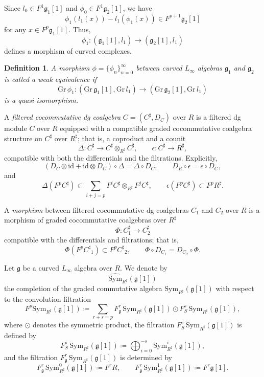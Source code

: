 \documentclass[12pt]{amsart}
\newtheorem{defn}{Definition}[section]
\numberwithin{equation}{section}
\theoremstyle{plain}
\newcommand{\fg}{\mathfrak{g}}
\newcommand{\Sym}{\mathrm{Sym}}
\newcommand{\Gr}{\mathrm{Gr}}
\newcommand{\id}{\mathrm{id}}
\newcommand{\wSym}{\widehat{\Sym}}
\newcommand{\uR}{{R^\sharp}}
\newcommand{\uC}{{C^\sharp}}
\begin{document}
	
	Since $l_0 \in F^1 \fg_1[1]$ and $\phi_0 \in F^1 \fg_2[1]$, we have
	\[
	\phi_1(l_1(x)) - l_1(\phi_1(x)) \in F^{p+1} \fg_2[1]
	\]
	for any $x \in F^p \fg_1[1]$. Thus, 
	\[
	\phi_1\colon (\fg_1[1],l_1) \rightarrow (\fg_2[1], l_1)
	\]
	defines a morphism of curved complexes.
	
	
	
	\begin{defn}
		A morphism $\phi=\{\phi_n\}_{n=0}^\infty$ between curved $L_\infty$ algebras $\fg_1$ and $\fg_2$  is called a \emph{weak equivalence} if 
		\[
		\Gr\, \phi_1 \colon (\Gr\, \fg_1[1], \Gr\, l_1) \longrightarrow(\Gr\, \fg_2[1], \Gr\, l_1)
		\]
		is a quasi-isomorphism.
	\end{defn}
	
	A \emph{filtered cocommutative dg coalgebra} $C=(\uC,D_C)$ over $R$ is a filtered dg module $C$ over $R$ equipped with a compatible graded cocommutative coalgebra structure on $\uC$ over $\uR$; that is, a coproduct and a counit
	\[
	\Delta \colon \uC \longrightarrow \uC \otimes_\uR \uC,
	\qquad
	\epsilon \colon \uC \longrightarrow \uR,
	\]
	compatible with both the differentials and the filtrations. Explicitly,
	\[
	(D_C \otimes \id + \id \otimes D_C)\circ \Delta
	=
	\Delta \circ D_C,
	\qquad
	D_R \circ \epsilon
	=
	\epsilon \circ D_C,
	\]
	and 
	\[
	\Delta(F^p \uC) \subset \sum_{i+j=p} F^i \uC \otimes_\uR F^j \uC,
	\qquad
	\epsilon(F^p \uC) \subset F^p \uR.
	\]
	
	A \emph{morphism} between filtered cocommutative dg coalgebras $C_1$ and $C_2$ over $R$ is a morphism of graded cocommutative coalgebras over $\uR$ 
	\[
	\Phi\colon C_1^\sharp \rightarrow C_2^\sharp
	\]
	compatible with the differentials and filtrations; that is,
	\[
	\Phi(F^p \uC_1) \subset F^p \uC_2, \qquad \Phi \circ D_{C_1} = D_{C_2} \circ \Phi.
	\]	
	
	Let $\fg$ be a curved $L_\infty$ algebra over $R$. We denote by
	\[
	\wSym_\uR(\fg[1])
	\]
	the completion of the graded commutative algebra $\Sym_\uR(\fg[1])$ with respect to the convolution filtration
	\[
	F^p \Sym_\uR(\fg[1]) \coloneqq \sum_{r+s=p} F_\fg^r\, \Sym_\uR(\fg[1]) \odot F_S^{s}\, \Sym_\uR(\fg[1]),
	\]
	where $\odot$ denotes the symmetric product, the filtration $F_S^{s}\, \Sym_\uR(\fg[1])$ is defined by
	\[
	F^{s}_S\, \Sym_\uR(\fg[1]) \coloneqq \bigoplus_{i=0}^{-s} \Sym_\uR^i(\fg[1]),
	\]
	and the filtration $F_\fg^r\, \Sym_\uR(\fg[1])$ is determined by
	\[
	F^r_\fg\, \Sym^0_\uR(\fg[1]) \coloneqq F^r R, \qquad F^r_\fg\, \Sym^1_\uR(\fg[1]) \coloneqq F^r \fg[1].
	\]
	
\end{document}
